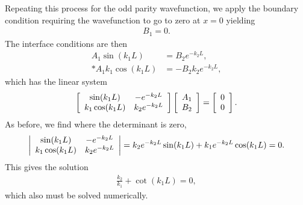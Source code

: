 Repeating this process for the odd parity wavefunction, we apply the boundary condition requiring the wavefunction to go to zero at $x = 0$ yielding
\begin{align}
  B_1 = 0.
\end{align}
The interface conditions are then
\begin{subequations}
\begin{align}
      A_1 \sin ( k_1 L ) &=  B_2 e^{-k_2 L}, \\*
  A_1 k_1 \cos ( k_1 L ) &= -B_2 k_2 e^{-k_2 L} ,
\end{align}
\end{subequations}
which has the linear system
\begin{align}
  \left[ \begin{array}{c c}
       \sin( k_1 L ) &     -e^{-k_2 L} \\
   k_1 \cos( k_1 L ) &  k_2 e^{-k_2 L} \\ \end{array} \right]
  \left[ \begin{array}{c} A_1 \\ B_2 \\ \end{array} \right] =
  \left[ \begin{array}{c} 0 \\ 0 \\ \end{array} \right] .
\end{align}
As before, we find where the determinant is zero,
\begin{align}
  \left| \begin{array}{c c}
       \sin( k_1 L ) &     -e^{-k_2 L} \\
   k_1 \cos( k_1 L ) &  k_2 e^{-k_2 L} \\ \end{array} \right| = k_2  e^{-k_2 L} \sin( k_1 L ) + k_1 e^{-k_2 L} \cos( k_1 L ) = 0.
\end{align}
This gives the solution
\begin{align}
  \frac{k_2}{k_1} + \cot ( k_1 L ) = 0,
\end{align}
which also must be solved numerically.

